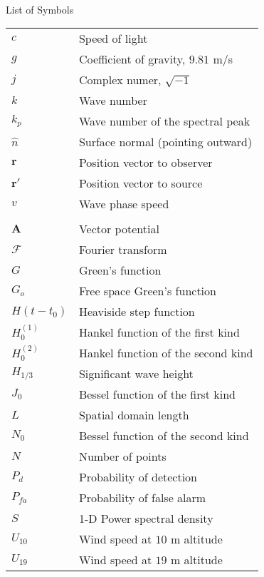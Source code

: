 \renewcommand{\baselinestretch}{1}
\small\normalsize
\hbox{\ }

\vspace{-4em}

\begin{center}
\large{List of Symbols}
\end{center} 

\vspace{3pt}

\begin{supertabular}{ll}
$c$ & Speed of light \\
$g$ & Coefficient of gravity, $9.81$ m/s \\
$j$ & Complex numer, $\sqrt{-1}$ \\
$k$ & Wave number \\
$k_p$ & Wave number of the spectral peak \\
$\hat{n}$ & Surface normal (pointing outward) \\
$\mathbf{r}$ & Position vector to observer \\
$\mathbf{r}'$ & Position vector to source \\
$v$ & Wave phase speed \\
\\
$\mathbf{A}$ & Vector potential \\
$\mathcal{F}$ & Fourier transform \\
$G$ & Green's function \\
$G_o$ & Free space Green's function \\
$H(t-t_0)$ & Heaviside step function \\
$H_0^{(1)}$ & Hankel function of the first kind \\
$H_0^{(2)}$ & Hankel function of the second kind \\
$H_{1/3}$ & Significant wave height \\
$J_0$ & Bessel function of the first kind \\
$L$ & Spatial domain length \\
$N_0$ & Bessel function of the second kind \\
$N$ & Number of points \\
$P_d$ & Probability of detection \\
$P_{fa}$ & Probability of false alarm \\
$S$ & 1-D Power spectral density \\
$U_{10}$ & Wind speed at $10$ m altitude \\
$U_{19}$ & Wind speed at $19$ m altitude \\

\end{supertabular}
